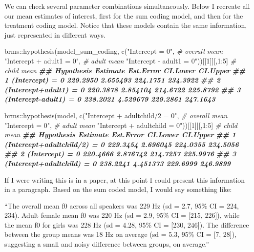 \documentclass[
]{book}
\newenvironment{Shaded}{\begin{snugshade}}{\end{snugshade}}
\newcommand{\CommentTok}[1]{\textcolor[rgb]{0.56,0.35,0.01}{\textit{#1}}}
\newcommand{\DecValTok}[1]{\textcolor[rgb]{0.00,0.00,0.81}{#1}}
\newcommand{\DocumentationTok}[1]{\textcolor[rgb]{0.56,0.35,0.01}{\textbf{\textit{#1}}}}
\newcommand{\FunctionTok}[1]{\textcolor[rgb]{0.00,0.00,0.00}{#1}}
\newcommand{\NormalTok}[1]{#1}
\newcommand{\SpecialCharTok}[1]{\textcolor[rgb]{0.00,0.00,0.00}{#1}}
\newcommand{\StringTok}[1]{\textcolor[rgb]{0.31,0.60,0.02}{#1}}
\begin{document}
We can check several parameter combinations simultaneously. Below I recreate all our mean estimates of interest, first for the sum coding model, and then for the treatment coding model. Notice that these models contain the same information, just represented in different ways.

\begin{Shaded}
\begin{Highlighting}[]
\NormalTok{brms}\SpecialCharTok{::}\FunctionTok{hypothesis}\NormalTok{(model\_sum\_coding, }
                 \FunctionTok{c}\NormalTok{(}\StringTok{"Intercept = 0"}\NormalTok{,   }\CommentTok{\# overall mean}
                   \StringTok{"Intercept + adult1 = 0"}\NormalTok{,  }\CommentTok{\# adult mean}
                   \StringTok{"Intercept {-} adult1 = 0"}\NormalTok{))[[}\DecValTok{1}\NormalTok{]][,}\DecValTok{1}\SpecialCharTok{:}\DecValTok{5}\NormalTok{] }\CommentTok{\# child mean}
\DocumentationTok{\#\#               Hypothesis Estimate Est.Error CI.Lower CI.Upper}
\DocumentationTok{\#\# 1        (Intercept) = 0 229.2950  2.655493 224.1751 234.3922}
\DocumentationTok{\#\# 2 (Intercept+adult1) = 0 220.3878  2.854104 214.6722 225.8792}
\DocumentationTok{\#\# 3 (Intercept{-}adult1) = 0 238.2021  4.529679 229.2861 247.1643}

\NormalTok{brms}\SpecialCharTok{::}\FunctionTok{hypothesis}\NormalTok{(model, }
                 \FunctionTok{c}\NormalTok{(}\StringTok{"Intercept + adultchild/2 = 0"}\NormalTok{,   }\CommentTok{\# overall mean}
                   \StringTok{"Intercept = 0"}\NormalTok{,  }\CommentTok{\# adult mean}
                   \StringTok{"Intercept + adultchild = 0"}\NormalTok{))[[}\DecValTok{1}\NormalTok{]][,}\DecValTok{1}\SpecialCharTok{:}\DecValTok{5}\NormalTok{] }\CommentTok{\# child mean}
\DocumentationTok{\#\#                     Hypothesis Estimate Est.Error CI.Lower CI.Upper}
\DocumentationTok{\#\# 1 (Intercept+adultchild/2) = 0 229.3454  2.696045 224.0355 234.5056}
\DocumentationTok{\#\# 2              (Intercept) = 0 220.4666  2.876742 214.7257 225.9976}
\DocumentationTok{\#\# 3   (Intercept+adultchild) = 0 238.2241  4.451373 229.6999 246.9899}
\end{Highlighting}
\end{Shaded}

If I were writing this is in a paper, at this point I could present this information in a paragraph. Based on the sum coded model, I would say something like:

``The overall mean f0 across all speakers was 229 Hz (sd = 2.7, 95\% CI = 224, 234). Adult female mean f0 was 220 Hz (sd = 2.9, 95\% CI = {[}215, 226{]}), while the mean f0 for girls was 228 Hz (sd = 4.28, 95\% CI = {[}230, 246{]}). The difference between the group means was 18 Hz on average (sd = 5.3, 95\% CI = {[}7, 28{]}), suggesting a small and noisy difference between groups, on average.''
\end{document}
